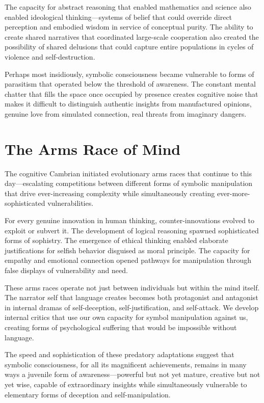 The capacity for abstract reasoning that enabled mathematics and science also enabled ideological thinking—systems of belief that could override direct perception and embodied wisdom in service of conceptual purity. The ability to create shared narratives that coordinated large-scale cooperation also created the possibility of shared delusions that could capture entire populations in cycles of violence and self-destruction.

Perhaps most insidiously, symbolic consciousness became vulnerable to forms of parasitism that operated below the threshold of awareness. The constant mental chatter that fills the space once occupied by presence creates cognitive noise that makes it difficult to distinguish authentic insights from manufactured opinions, genuine love from simulated connection, real threats from imaginary dangers.

\section{The Arms Race of Mind}

The cognitive Cambrian initiated evolutionary arms races that continue to this day—escalating competitions between different forms of symbolic manipulation that drive ever-increasing complexity while simultaneously creating ever-more-sophisticated vulnerabilities.

For every genuine innovation in human thinking, counter-innovations evolved to exploit or subvert it. The development of logical reasoning spawned sophisticated forms of sophistry. The emergence of ethical thinking enabled elaborate justifications for selfish behavior disguised as moral principle. The capacity for empathy and emotional connection opened pathways for manipulation through false displays of vulnerability and need.

These arms races operate not just between individuals but within the mind itself. The narrator self that language creates becomes both protagonist and antagonist in internal dramas of self-deception, self-justification, and self-attack. We develop internal critics that use our own capacity for symbol manipulation against us, creating forms of psychological suffering that would be impossible without language.

The speed and sophistication of these predatory adaptations suggest that symbolic consciousness, for all its magnificent achievements, remains in many ways a juvenile form of awareness—powerful but not yet mature, creative but not yet wise, capable of extraordinary insights while simultaneously vulnerable to elementary forms of deception and self-manipulation.

